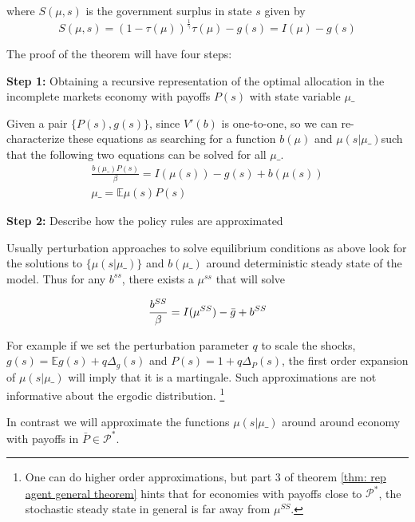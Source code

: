 \documentclass[thmsb,11pt]{article}
\newcommand{\EE}{\mathbb E}
\begin{document}
where $S(\mu,s)$ is the government surplus in state $s$ given by
\[
	S(\mu,s) = (1-\tau(\mu))^\frac1\gamma \tau(\mu)-g(s) = I(\mu) - g(s)
\]


The proof of the theorem will have four steps:

\textbf{Step 1:} Obtaining a recursive representation of the optimal allocation in the incomplete markets economy with payoffs $P(s)$ with state variable $\mu\_$


Given a pair $\{P(s),g(s)\}$, since $V'(b)$ is one-to-one, so we can re-characterize these equations as searching for a function $b(\mu)$ and $\mu(s|\mu\_)$such that the following two equations can be solved for all $\mu\_$.
\begin{align}\label{eq.lin_imp}
	\frac{b(\mu\_)P(s)}{\beta } = I(\mu(s)) - g(s) +b(\mu(s))\\
	\mu\_ = \EE\mu(s)P(s)\label{eq.lin_mart}
\end{align}



\textbf{Step 2:} Describe how the policy rules are approximated

Usually perturbation approaches  to solve equilibrium conditions as above look for the solutions to $\{\mu(s|\mu\_)\}$ and $b(\mu\_)$ around deterministic steady state of the model. Thus for any $b^{ss}$, there exists a $\mu^{ss}$ that will solve

\[	\frac{b^{SS}}{\beta } = I(\mu^{SS}) - \bar{g} +b^{SS}\\
\]


For example if we set the perturbation parameter $q$ to scale the shocks, $g(s)=\mathbb{E}g(s)+q\Delta_g(s)$ and $P(s)=1+q\Delta_{P}(s)$, the first order expansion of $\mu(s|\mu\_)$ will imply that it is a martingale. Such approximations are not informative about the ergodic distribution. \footnote{One can do higher order approximations, but part 3 of theorem \ref{thm: rep agent general theorem} hints that for economies with payoffs close to $\mathcal{P}^*$, the stochastic steady state in general is far away from $\mu^{SS}$.}



In contrast we will approximate the functions $\mu(s|\mu\_)$ around
around economy with payoffs in $\bar{P}\in \mathcal{P}^*$.
\end{document}
